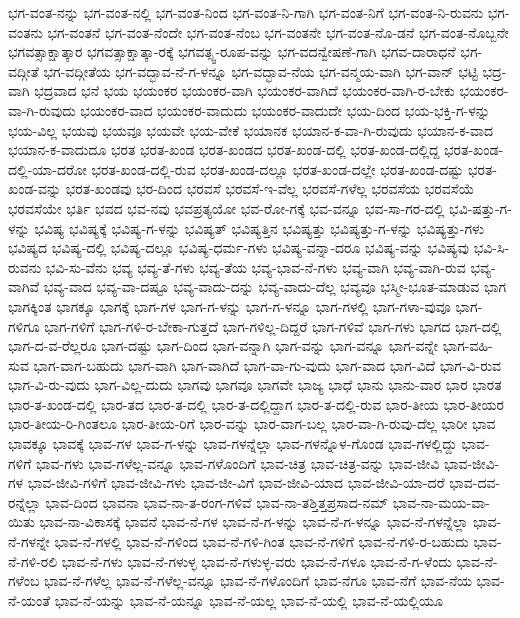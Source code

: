 {ಭಗ-ವಂತ-ನನ್ನು
ಭಗ-ವಂತ-ನಲ್ಲಿ
ಭಗ-ವಂತ-ನಿಂದ
ಭಗ-ವಂತ-ನಿ-ಗಾಗಿ
ಭಗ-ವಂತ-ನಿಗೆ
ಭಗ-ವಂತ-ನಿ-ರುವನು
ಭಗ-ವಂತನು
ಭಗ-ವಂತನೆ
ಭಗ-ವಂತ-ನೆಂದೇ
ಭಗ-ವಂತ-ನೆಂಬ
ಭಗ-ವಂತನೇ
ಭಗ-ವಂತ-ನೊ-ಡನೆ
ಭಗ-ವಂತ-ನೊಬ್ಬನೇ
ಭಗವತ್ಸಾಕ್ಷಾತ್ಕಾರ
ಭಗವತ್ಸಾಕ್ಷಾತ್ಕಾ-ರಕ್ಕೆ
ಭಗವತ್ಸ್ವ-ರೂಪ-ವನ್ನು
ಭಗ-ವದನ್ವೇಷಣೆ-ಗಾಗಿ
ಭಗವ-ದಾರಾಧನೆ
ಭಗ-ವದ್ಗೀತೆ
ಭಗ-ವದ್ಗೀತೆಯ
ಭಗ-ವದ್ಭಾವ-ನೆ-ಗ-ಳನ್ನೂ
ಭಗ-ವದ್ಭಾವ-ನೆಯ
ಭಗ-ವನ್ಮಯ-ವಾಗಿ
ಭಗ-ವಾನ್
ಭಟ್ಟಿ
ಭದ್ರ-ವಾಗಿ
ಭದ್ರವಾದ
ಭನೆ
ಭಯ
ಭಯಂಕರ
ಭಯಂಕರ-ವಾಗಿ
ಭಯಂಕರ-ವಾಗಿದೆ
ಭಯಂಕರ-ವಾಗಿ-ರ-ಬೇಕು
ಭಯಂಕರ-ವಾ-ಗಿ-ರುವುದು
ಭಯಂಕರ-ವಾದ
ಭಯಂಕರ-ವಾದುದು
ಭಯಂಕರ-ವಾದುದೇ
ಭಯ-ದಿಂದ
ಭಯ-ಭಕ್ತಿ-ಗ-ಳನ್ನು
ಭಯ-ವಿಲ್ಲ
ಭಯವು
ಭಯವೂ
ಭಯವೇ
ಭಯ-ವೇಕೆ
ಭಯಾನಕ
ಭಯಾನ-ಕ-ವಾ-ಗಿ-ರುವುದು
ಭಯಾನ-ಕ-ವಾದ
ಭಯಾನ-ಕ-ವಾದುದೂ
ಭರತ
ಭರತ-ಖಂಡ
ಭರತ-ಖಂಡದ
ಭರತ-ಖಂಡ-ದಲ್ಲಿ
ಭರತ-ಖಂಡ-ದಲ್ಲಿದ್ದ
ಭರತ-ಖಂಡ-ದಲ್ಲಿ-ಯಾ-ದರೋ
ಭರತ-ಖಂಡ-ದಲ್ಲಿ-ರುವ
ಭರತ-ಖಂಡ-ದಲ್ಲೂ
ಭರತ-ಖಂಡ-ದಲ್ಲೇ
ಭರತ-ಖಂಡ-ದಷ್ಟು
ಭರತ-ಖಂಡ-ವನ್ನು
ಭರತ-ಖಂಡವು
ಭರ-ದಿಂದ
ಭರವಸೆ
ಭರವಸೆ-ಇ-ವೆಲ್ಲ
ಭರವಸೆ-ಗಳೆಲ್ಲ
ಭರವಸೆಯ
ಭರವಸೆಯೆ
ಭರವಸೆಯೇ
ಭರ್ತಿ
ಭವದ
ಭವ-ನವು
ಭವಪ್ರತ್ಯಯೋ
ಭವ-ರೋ-ಗಕ್ಕೆ
ಭವ-ವನ್ನೂ
ಭವ-ಸಾ-ಗರ-ದಲ್ಲಿ
ಭವಿ-ಷತ್ತು-ಗ-ಳನ್ನು
ಭವಿಷ್ಯ
ಭವಿಷ್ಯಕ್ಕೆ
ಭವಿಷ್ಯ-ಗ-ಳನ್ನು
ಭವಿಷ್ಯತ್
ಭವಿಷ್ಯತ್ತಿನ
ಭವಿಷ್ಯತ್ತು
ಭವಿಷ್ಯತ್ತು-ಗ-ಳನ್ನು
ಭವಿಷ್ಯತ್ತು-ಗಳು
ಭವಿಷ್ಯದ
ಭವಿಷ್ಯ-ದಲ್ಲಿ
ಭವಿಷ್ಯ-ದಲ್ಲೂ
ಭವಿಷ್ಯ-ಧರ್ಮ-ಗಳು
ಭವಿಷ್ಯ-ವನ್ನಾ-ದರೂ
ಭವಿಷ್ಯ-ವನ್ನು
ಭವಿಷ್ಯವು
ಭವಿ-ಸಿ-ರುವನು
ಭವಿ-ಸು-ವೆನು
ಭವ್ಯ
ಭವ್ಯ-ತೆ-ಗಳು
ಭವ್ಯ-ತೆಯ
ಭವ್ಯ-ಭಾವ-ನೆ-ಗಳು
ಭವ್ಯ-ವಾಗಿ
ಭವ್ಯ-ವಾಗಿ-ರುವ
ಭವ್ಯ-ವಾಗಿವೆ
ಭವ್ಯ-ವಾದ
ಭವ್ಯ-ವಾ-ದಷ್ಟೂ
ಭವ್ಯ-ವಾದು-ದನ್ನು
ಭವ್ಯ-ವಾದು-ದೆಲ್ಲ
ಭವ್ಯವೂ
ಭಸ್ಮೀ-ಭೂತ-ಮಾಡುವ
ಭಾಗ
ಭಾಗಕ್ಕಿಂತ
ಭಾಗಕ್ಕೂ
ಭಾಗಕ್ಕೆ
ಭಾಗ-ಗಳ
ಭಾಗ-ಗ-ಳನ್ನು
ಭಾಗ-ಗ-ಳನ್ನೂ
ಭಾಗ-ಗಳಲ್ಲಿ
ಭಾಗ-ಗಳಾ-ವುವೂ
ಭಾಗ-ಗಳಿಗೂ
ಭಾಗ-ಗಳಿಗೆ
ಭಾಗ-ಗಳಿ-ರ-ಬೇಕಾ-ಗುತ್ತದೆ
ಭಾಗ-ಗಳಿಲ್ಲ-ದಿದ್ದರೆ
ಭಾಗ-ಗಳಿವೆ
ಭಾಗ-ಗಳು
ಭಾಗದ
ಭಾಗ-ದಲ್ಲಿ
ಭಾಗ-ದ-ವ-ರೆಲ್ಲರೂ
ಭಾಗ-ದಷ್ಟು
ಭಾಗ-ದಿಂದ
ಭಾಗ-ವನ್ನಾಗಿ
ಭಾಗ-ವನ್ನು
ಭಾಗ-ವನ್ನೂ
ಭಾಗ-ವನ್ನೇ
ಭಾಗ-ವಹಿ-ಸುವ
ಭಾಗ-ವಾಗ-ಬಹುದು
ಭಾಗ-ವಾಗಿ
ಭಾಗ-ವಾಗಿದೆ
ಭಾಗ-ವಾ-ಗು-ವುದು
ಭಾಗ-ವಾದ
ಭಾಗ-ವಿದೆ
ಭಾಗ-ವಿ-ರುವ
ಭಾಗ-ವಿ-ರು-ವುದು
ಭಾಗ-ವಿಲ್ಲ-ದುದು
ಭಾಗವು
ಭಾಗವೂ
ಭಾಗವೇ
ಭಾಜ್ಯ
ಭಾಧೆ
ಭಾನು
ಭಾನು-ವಾರ
ಭಾರ
ಭಾರತ
ಭಾರ-ತ-ಖಂಡ-ದಲ್ಲಿ
ಭಾರ-ತದ
ಭಾರ-ತ-ದಲ್ಲಿ
ಭಾರ-ತ-ದಲ್ಲಿದ್ದಾಗ
ಭಾರ-ತ-ದಲ್ಲಿ-ರುವ
ಭಾರ-ತೀಯ
ಭಾರ-ತೀಯರ
ಭಾರ-ತೀಯ-ರಿ-ಗಿಂತಲೂ
ಭಾರ-ತೀಯ-ರಿಗೆ
ಭಾರ-ವನ್ನು
ಭಾರ-ವಾಗ-ಬಲ್ಲ
ಭಾರ-ವಾ-ಗಿ-ರುವು-ದೆಲ್ಲ
ಭಾರೀ
ಭಾವ
ಭಾವಕ್ಕೂ
ಭಾವಕ್ಕೆ
ಭಾವ-ಗಳ
ಭಾವ-ಗ-ಳನ್ನು
ಭಾವ-ಗಳನ್ನೆಲ್ಲಾ
ಭಾವ-ಗಳನ್ನೊಳ-ಗೊಂಡ
ಭಾವ-ಗಳಲ್ಲಿದ್ದು
ಭಾವ-ಗಳಿಗೆ
ಭಾವ-ಗಳು
ಭಾವ-ಗಳೆಲ್ಲ-ವನ್ನೂ
ಭಾವ-ಗಳೊಂದಿಗೆ
ಭಾವ-ಚಿತ್ರ
ಭಾವ-ಚಿತ್ರ-ವನ್ನು
ಭಾವ-ಜೀವಿ
ಭಾವ-ಜೀವಿ-ಗಳ
ಭಾವ-ಜೀವಿ-ಗಳಿಗೆ
ಭಾವ-ಜೀವಿ-ಗಳು
ಭಾವ-ಜೀ-ವಿಗೆ
ಭಾವ-ಜೀವಿ-ಯಾದ
ಭಾವ-ಜೀವಿ-ಯಾ-ದರೆ
ಭಾವ-ದವ-ರನ್ನೆಲ್ಲಾ
ಭಾವ-ದಿಂದ
ಭಾವನಾ
ಭಾವ-ನಾ-ತ-ರಂಗ-ಗಳಿವೆ
ಭಾವ-ನಾ-ತಶ್ತಿತ್ತಪ್ರಸಾದ-ನಮ್
ಭಾವ-ನಾ-ಮಯ-ವಾ-ಯಿತು
ಭಾವ-ನಾ-ವಿಕಾಸಕ್ಕೆ
ಭಾವನೆ
ಭಾವ-ನೆ-ಗಳ
ಭಾವ-ನೆ-ಗ-ಳನ್ನು
ಭಾವ-ನೆ-ಗ-ಳನ್ನೂ
ಭಾವ-ನೆ-ಗಳನ್ನೆಲ್ಲಾ
ಭಾವ-ನೆ-ಗಳನ್ನೇ
ಭಾವ-ನೆ-ಗಳಲ್ಲಿ
ಭಾವ-ನೆ-ಗಳಿಂದ
ಭಾವ-ನೆ-ಗಳಿ-ಗಿಂತ
ಭಾವ-ನೆ-ಗಳಿಗೆ
ಭಾವ-ನೆ-ಗಳಿ-ರ-ಬಹುದು
ಭಾವ-ನೆ-ಗಳಿ-ರಲಿ
ಭಾವ-ನೆ-ಗಳು
ಭಾವ-ನೆ-ಗಳುಳ್ಳ
ಭಾವ-ನೆ-ಗಳುಳ್ಳ-ವರು
ಭಾವ-ನೆ-ಗಳೂ
ಭಾವ-ನೆ-ಗ-ಳೆಂದು
ಭಾವ-ನೆ-ಗಳೆಂಬ
ಭಾವ-ನೆ-ಗಳೆಲ್ಲ
ಭಾವ-ನೆ-ಗಳೆಲ್ಲ-ವನ್ನೂ
ಭಾವ-ನೆ-ಗಳೊಂದಿಗೆ
ಭಾವ-ನೆಗೂ
ಭಾವ-ನೆಗೆ
ಭಾವ-ನೆಯ
ಭಾವ-ನೆ-ಯಂತೆ
ಭಾವ-ನೆ-ಯನ್ನು
ಭಾವ-ನೆ-ಯನ್ನೂ
ಭಾವ-ನೆ-ಯಲ್ಲ
ಭಾವ-ನೆ-ಯಲ್ಲಿ
ಭಾವ-ನೆ-ಯಲ್ಲಿಯೂ
}
